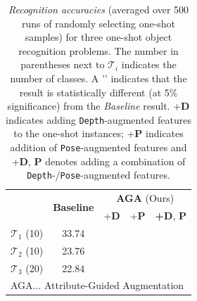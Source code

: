 \documentclass[10pt,twocolumn,letterpaper]{article}
\begin{document}
\begin{table}
\begin{tabular}{rcccc}
\hline
& \multirow{2}{*}{\textbf{Baseline}} & \multicolumn{3}{c}{\textbf{AGA} (Ours)}\\
& 						     &  +\textbf{D} & +\textbf{P} &  \textbf{+D}, \textbf{P} \\
\hline
$\mathcal{T}_1$ (10)  	& 33.74	
					&  \cellcolor{green!30}{38.84~\checkmark} 
					&  \cellcolor{green!05}{36.01~\checkmark} 
					&  \cellcolor{green!60}{39.12~\checkmark}\\
$\mathcal{T}_2$ (10) 	& 23.76  	
					&  \cellcolor{green!30}{28.95~\checkmark}
					&  \cellcolor{green!05}{27.01~\checkmark}
					&  \cellcolor{green!60}{30.13~\checkmark}\\
$\mathcal{T}_3$ (20) 	& 22.84	
					&  \cellcolor{green!30}{25.84~\checkmark}
					& \cellcolor{green!05}{24.35~\checkmark}
					&  \cellcolor{green!60}{26.91~\checkmark} \\ 
					\hline
\multicolumn{5}{l}{\footnotesize AGA$ \ldots$ Attribute-Guided Augmentation} \\
\end{tabular}
\caption{\label{table:oneshot} \emph{Recognition accuracies} (averaged over 500 runs
of randomly selecting one-shot samples) for three one-shot object recognition problems.
The number in parentheses next to $\mathcal{T}_i$ indicates the number of classes.
A '\checkmark' indicates that the result is statistically different (at 5\% significance) 
from the \emph{Baseline} result. +\textbf{D} indicates adding \texttt{Depth}-augmented 
features to the one-shot instances; +\textbf{P} indicates addition of \texttt{Pose}-augmented features
and +\textbf{D}, \textbf{P} denotes adding a combination of \texttt{Depth}-/\texttt{Pose}-augmented 
features.}
\end{table}
\end{document}

